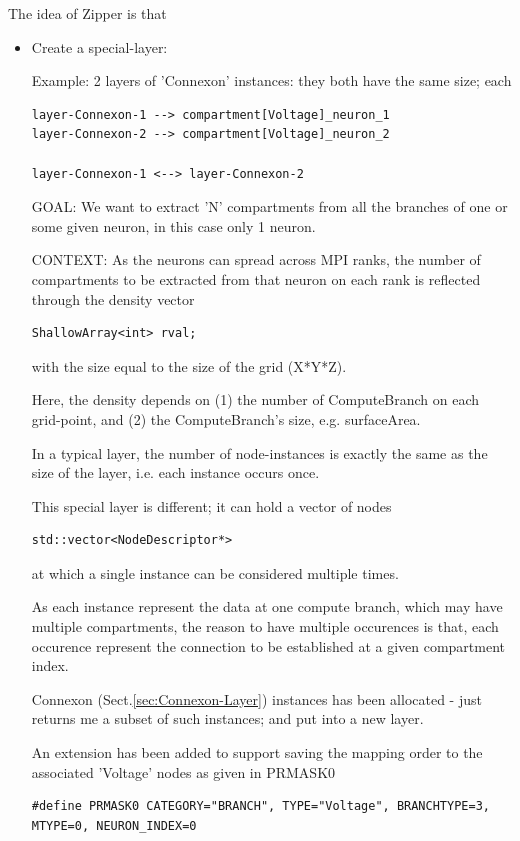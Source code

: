 The idea of Zipper is that
\begin{itemize}
  \item Create a special-layer: 

Example: 2 layers of 'Connexon' instances: they both have the same size; each 
\begin{verbatim}
layer-Connexon-1 --> compartment[Voltage]_neuron_1
layer-Connexon-2 --> compartment[Voltage]_neuron_2

layer-Connexon-1 <--> layer-Connexon-2

\end{verbatim}   

GOAL: We want to extract 'N' compartments from all the branches of one or
some given neuron, in this case only 1 neuron. 

CONTEXT: As the neurons can spread across MPI ranks, the number of compartments
to be extracted from that neuron on each rank is reflected through the density
vector
\begin{verbatim}
ShallowArray<int> rval;
\end{verbatim}
with the size equal to the size of the grid (X*Y*Z).

Here, the density depends on (1) the number of ComputeBranch on each
grid-point, and (2) the ComputeBranch's size, e.g.
surfaceArea.
 
In a typical layer, the number of node-instances is exactly the same as the
size of the layer, i.e. each instance occurs once.
  
This special layer is different; it can hold a vector of nodes
\begin{verbatim}
std::vector<NodeDescriptor*>
\end{verbatim}
at which a single instance can be considered multiple times.

As each instance represent the data at one compute branch, which may have
multiple compartments, the reason to have multiple occurences is that, each
occurence represent the connection to be established at a given compartment
index.

Connexon (Sect.\ref{sec:Connexon-Layer}) instances has been
allocated - just returns me a subset of such instances; and put into a new
layer.

An extension has been added to support saving the mapping order to the
associated 'Voltage' nodes as given in PRMASK0
\begin{verbatim}
#define PRMASK0 CATEGORY="BRANCH", TYPE="Voltage", BRANCHTYPE=3, MTYPE=0, NEURON_INDEX=0


\end{verbatim}
\end{itemize}
